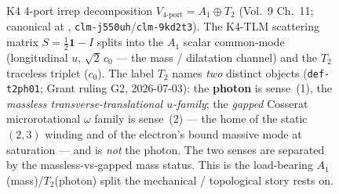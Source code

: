 \begin{figure}[htbp]
\caption{K4 4-port irrep decomposition $V_{\text{4-port}} = A_1 \oplus T_2$ (Vol.~9 Ch.~11; canonical at , \texttt{clm-j550uh}/\texttt{clm-9kd2t3}). The K4-TLM scattering matrix $S = \tfrac{1}{2}\mathbf{1} - I$ splits into the $A_1$ scalar common-mode (longitudinal $u$, $\sqrt{2}\,c_0$ — the mass / dilatation channel) and the $T_2$ traceless triplet ($c_0$). The label $T_2$ names \emph{two} distinct objects (\texttt{def-t2ph01}; Grant ruling G2, 2026-07-03): the \textbf{photon} is sense~(1), the \emph{massless transverse-translational $u$-family}; the \emph{gapped} Cosserat microrotational $\omega$ family is sense~(2) --- the home of the static $(2,3)$ winding and of the electron's bound massive mode at saturation --- and is \emph{not} the photon. The two senses are separated by the massless-vs-gapped mass status. This is the load-bearing $A_1$(mass)/$T_2$(photon) split the mechanical / topological story rests on.}
\label{fig:vol9_k4_irrep_decomposition}
\end{figure}
%
